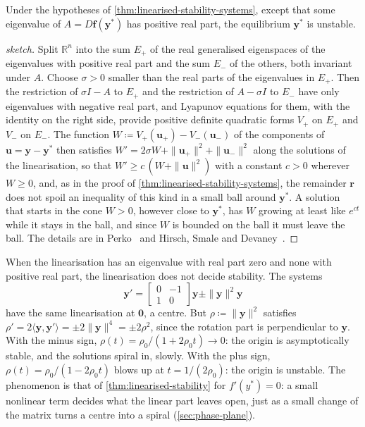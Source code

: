 \begin{theorem}
\label{thm:linearised-instability}
Under the hypotheses of \cref{thm:linearised-stability-systems}, except that some eigenvalue of $A=D\mathbf f(\mathbf y^*)$ has positive real part, the equilibrium $\mathbf y^*$ is unstable.
\end{theorem}

\begin{proof}[sketch]
Split $\mathbb R^n$ into the sum $E_+$ of the real generalised eigenspaces of the eigenvalues with positive real part and the sum $E_-$ of the others, both invariant under $A$. Choose $\sigma>0$ smaller than the real parts of the eigenvalues in $E_+$. Then the restriction of $\sigma I-A$ to $E_+$ and the restriction of $A-\sigma I$ to $E_-$ have only eigenvalues with negative real part, and Lyapunov equations for them, with the identity on the right side, provide positive definite quadratic forms $V_+$ on $E_+$ and $V_-$ on $E_-$. The function $W\coloneqq V_+(\mathbf u_+)-V_-(\mathbf u_-)$ of the components of $\mathbf u=\mathbf y-\mathbf y^*$ then satisfies $W'=2\sigma W+\|\mathbf u_+\|^2+\|\mathbf u_-\|^2$ along the solutions of the linearisation, so that $W'\ge c\,(W+\|\mathbf u\|^2)$ with a constant $c>0$ wherever $W\ge0$, and, as in the proof of \cref{thm:linearised-stability-systems}, the remainder $\mathbf r$ does not spoil an inequality of this kind in a small ball around $\mathbf y^*$. A solution that starts in the cone $W>0$, however close to $\mathbf y^*$, has $W$ growing at least like $e^{ct}$ while it stays in the ball, and since $W$ is bounded on the ball it must leave the ball. The details are in Perko~\cite[Chap.~2]{perko2001} and Hirsch, Smale and Devaney~\cite{hirsch2013}.
\end{proof}

When the linearisation has an eigenvalue with real part zero and none with positive real part, the linearisation does not decide stability. The systems
\[
\mathbf y'=\begin{bmatrix}0&-1\\1&0\end{bmatrix}\mathbf y\pm\|\mathbf y\|^2\mathbf y
\]
have the same linearisation at $\mathbf 0$, a centre. But $\rho\coloneqq\|\mathbf y\|^2$ satisfies $\rho'=2\langle\mathbf y,\mathbf y'\rangle=\pm2\|\mathbf y\|^4=\pm2\rho^2$, since the rotation part is perpendicular to $\mathbf y$. With the minus sign, $\rho(t)=\rho_0/(1+2\rho_0t)\to0$: the origin is asymptotically stable, and the solutions spiral in, slowly. With the plus sign, $\rho(t)=\rho_0/(1-2\rho_0t)$ blows up at $t=1/(2\rho_0)$: the origin is unstable. The phenomenon is that of \cref{thm:linearised-stability} for $f'(y^*)=0$: a small nonlinear term decides what the linear part leaves open, just as a small change of the matrix turns a centre into a spiral (\cref{sec:phase-plane}).

